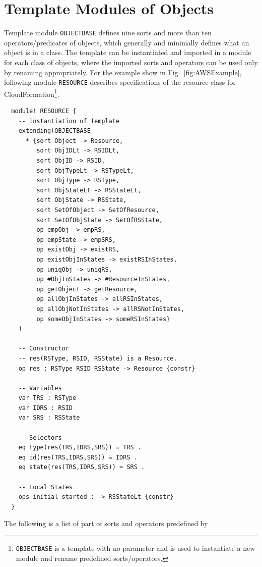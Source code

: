 \documentclass[12pt]{report}
\begin{document}
\section{Template Modules of Objects}
\label{sec:objectbase}
Template module {\tt OBJECTBASE} defines nine sorts and more than ten
operators/predicates of objects, which generally and minimally defines
what an object is in a class. The template can be instantiated and
imported in a module for each class of objects, where the imported
sorts and operators can be used only by renaming appropriately. For
the example show in Fig.~\ref{fig:AWSExample}, following module
{\tt RESOURCE} describes specifications of the resource class for
CloudFormation\footnote{{\tt OBJECTBASE} is a template with no
  parameter and is used to instantiate a new module and rename
  predefined sorts/operators.}.
\begin{verbatim}
  module! RESOURCE {
    -- Instantiation of Template
    extending(OBJECTBASE
      * {sort Object -> Resource,
         sort ObjIDLt -> RSIDLt,
         sort ObjID -> RSID,
         sort ObjTypeLt -> RSTypeLt,
         sort ObjType -> RSType,
         sort ObjStateLt -> RSStateLt,
         sort ObjState -> RSState,
         sort SetOfObject -> SetOfResource,
         sort SetOfObjState -> SetOfRSState,
         op empObj -> empRS,
         op empState -> empSRS,
         op existObj -> existRS,
         op existObjInStates -> existRSInStates,
         op uniqObj -> uniqRS,
         op #ObjInStates -> #ResourceInStates,
         op getObject -> getResource,
         op allObjInStates -> allRSInStates,
         op allObjNotInStates -> allRSNotInStates,
         op someObjInStates -> someRSInStates}
    )
  
    -- Constructor
    -- res(RSType, RSID, RSState) is a Resource.
    op res : RSType RSID RSState -> Resource {constr}
  
    -- Variables
    var TRS : RSType
    var IDRS : RSID
    var SRS : RSState
  
    -- Selectors
    eq type(res(TRS,IDRS,SRS)) = TRS .
    eq id(res(TRS,IDRS,SRS)) = IDRS .
    eq state(res(TRS,IDRS,SRS)) = SRS .
  
    -- Local States
    ops initial started : -> RSStateLt {constr}
  }
\end{verbatim}
The following is a list of part of sorts and operators predefined by
\end{document}
